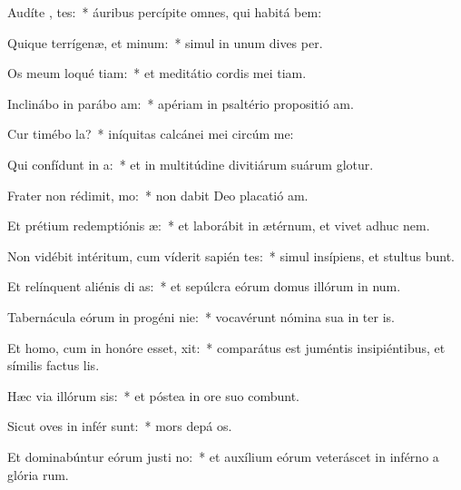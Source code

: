 \item Audíte ,  tes:~* áuribus percípite omnes, qui habitá bem:
\item Quique terrígenæ, et  minum:~* simul in unum dives  per.
\item Os meum loqué tiam:~* et meditátio cordis mei tiam.
\item Inclinábo in parábo  am:~* apériam in psaltério propositió am.
\item Cur timébo   la?~* iníquitas calcánei mei circúm me:
\item Qui confídunt in  a:~* et in multitúdine divitiárum suárum glotur.
\item Frater non rédimit,  mo:~* non dabit Deo placatió am.
\item Et prétium redemptiónis  æ:~* et laborábit in ætérnum, et vivet adhuc  nem.
\item Non vidébit intéritum, cum víderit sapién tes:~* simul insípiens, et stultus bunt.
\item Et relínquent aliénis di as:~* et sepúlcra eórum domus illórum in num.
\item Tabernácula eórum in progéni  nie:~* vocavérunt nómina sua in ter is.
\item Et homo, cum in honóre esset,  xit:~* comparátus est juméntis insipiéntibus, et símilis factus  lis.
\item Hæc via illórum  sis:~* et póstea in ore suo combunt.
\item Sicut oves in infér  sunt:~* mors depá os.
\item Et dominabúntur eórum justi  no:~* et auxílium eórum veteráscet in inférno a glória rum.
